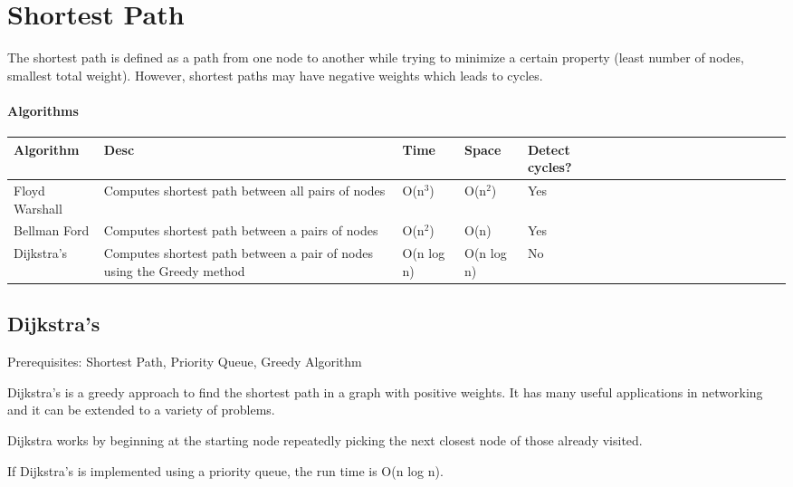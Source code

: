 \documentclass[11pt,oneside]{book}
\begin{document}
    \chapter{ Shortest Path }
        

The shortest path is defined as a path from one node to another while trying to minimize a certain property (least number of nodes, smallest total weight). However, shortest paths may have negative weights which leads to cycles.

\subsubsection{Algorithms}

\vspace{10px}\begin{tabulary}{0.4\linewidth}{|l|l|l|l|l|l|l|l|l|l|l|l|l|l|l|l|l|l|l}\hline


  Algorithm &
  Desc &
  Time &
  Space &
  Detect cycles?\\
\hline


  Floyd Warshall &
  Computes shortest path between all pairs of nodes &
  O(n$^{3}$) &
  O(n$^{2}$) &
  Yes\\

  Bellman Ford &
  Computes shortest path between a pairs of nodes &
  O(n$^{2}$) &
  O(n) &
  Yes\\

  Dijkstra's &
  Computes shortest path between a pair of nodes using the Greedy method &
  O(n log n) &
  O(n log n) &
  No\\

\hline\end{tabulary}


        \section{ Dijkstra's }
        

Prerequisites:  Shortest Path, Priority Queue, Greedy Algorithm

Dijkstra's is a greedy approach to find the shortest path in a graph with positive weights. It has many useful applications in networking and it can be extended to a variety of problems.

Dijkstra works by beginning at the starting node repeatedly picking the next closest node of those already visited.

If Dijkstra's is implemented using a priority queue, the run time is O(n log n).
\end{document}
